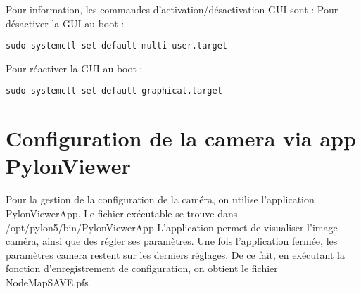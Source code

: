 Pour information, les commandes d’activation/désactivation GUI sont :
Pour désactiver la GUI au boot :
\begin{lstlisting}[style=Latex-color]
sudo systemctl set-default multi-user.target
\end{lstlisting}

Pour réactiver la GUI au boot :
\begin{lstlisting}[style=Latex-color]
sudo systemctl set-default graphical.target
\end{lstlisting}

\section{Configuration de la camera via app PylonViewer}
Pour la gestion de la configuration de la caméra, on utilise l’application PylonViewerApp.
Le fichier exécutable se trouve dans /opt/pylon5/bin/PylonViewerApp
L’application permet de visualiser l’image caméra, ainsi que des régler ses paramètres.
Une fois l’application fermée, les paramètres camera restent sur les derniers réglages.
De ce fait, en exécutant la fonction d’enregistrement de configuration, on obtient le fichier NodeMapSAVE.pfs
